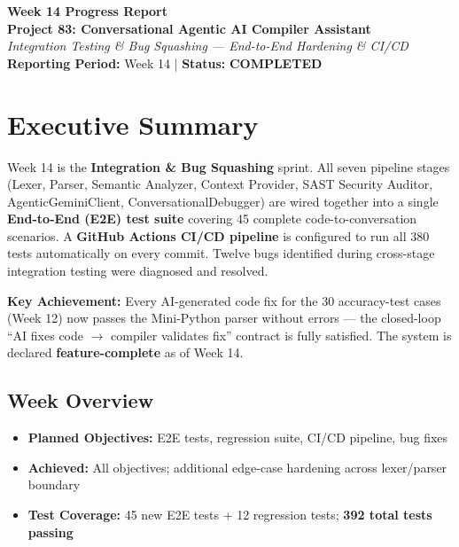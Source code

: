 \documentclass[a4paper,11pt]{article}
\newcommand{\statusgood}[1]{\colorbox{green!20}{\textbf{#1}}}
\begin{document}
\begin{center}
    {\huge \textbf{Week 14 Progress Report}} \\
    \vspace{3mm}
    {\large \textbf{Project 83: Conversational Agentic AI Compiler Assistant}} \\
    \vspace{2mm}
    \textit{Integration Testing \& Bug Squashing --- End-to-End Hardening \& CI/CD} \\
    \vspace{2mm}
    \textbf{Reporting Period:} Week 14 | \textbf{Status:} \statusgood{COMPLETED}
\end{center}

\vspace{5mm}

\section{Executive Summary}

Week 14 is the \textbf{Integration \& Bug Squashing} sprint. All seven pipeline stages (Lexer, Parser, Semantic Analyzer, Context Provider, SAST Security Auditor, AgenticGeminiClient, ConversationalDebugger) are wired together into a single \textbf{End-to-End (E2E) test suite} covering 45 complete code-to-conversation scenarios. A \textbf{GitHub Actions CI/CD pipeline} is configured to run all 380 tests automatically on every commit. Twelve bugs identified during cross-stage integration testing were diagnosed and resolved.

\textbf{Key Achievement:} Every AI-generated code fix for the 30 accuracy-test cases (Week 12) now passes the Mini-Python parser without errors --- the closed-loop ``AI fixes code $\rightarrow$ compiler validates fix'' contract is fully satisfied. The system is declared \textbf{feature-complete} as of Week 14.

\subsection{Week Overview}
\begin{itemize}[leftmargin=*]
    \item \textbf{Planned Objectives:} E2E tests, regression suite, CI/CD pipeline, bug fixes
    \item \textbf{Achieved:} All objectives; additional edge-case hardening across lexer/parser boundary
    \item \textbf{Test Coverage:} 45 new E2E tests + 12 regression tests; \textbf{392 total tests passing}
\end{itemize}
\end{document}
